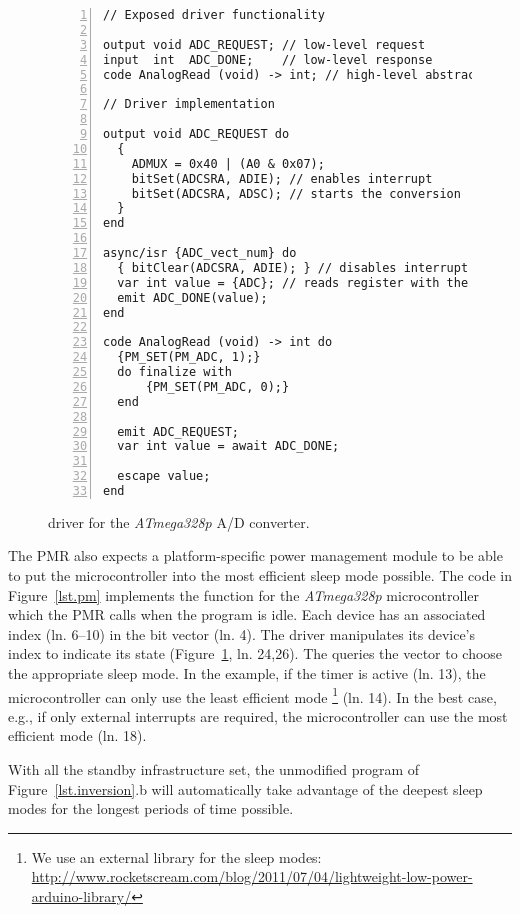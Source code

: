 \begin{figure}[t]
\begin{lstlisting}[numbers=left]
// Exposed driver functionality

output void ADC_REQUEST; // low-level request
input  int  ADC_DONE;    // low-level response
code AnalogRead (void) -> int; // high-level abstraction

// Driver implementation

output void ADC_REQUEST do
  {
    ADMUX = 0x40 | (A0 & 0x07);
    bitSet(ADCSRA, ADIE); // enables interrupt
    bitSet(ADCSRA, ADSC); // starts the conversion
  }
end

async/isr {ADC_vect_num} do
  { bitClear(ADCSRA, ADIE); } // disables interrupt
  var int value = {ADC}; // reads register with the value
  emit ADC_DONE(value);
end

code AnalogRead (void) -> int do
  {PM_SET(PM_ADC, 1);}
  do finalize with
      {PM_SET(PM_ADC, 0);}
  end

  emit ADC_REQUEST;
  var int value = await ADC_DONE;

  escape value;
end
\end{lstlisting}
\caption{ \CEU driver for the \emph{ATmega328p} A/D converter.
\label{lst.adc}
}
\end{figure}

The PMR also expects a platform-specific power management module to be able to
put the microcontroller into the most efficient sleep mode possible.
%
The code in Figure~\ref{lst.pm} implements the  function for
the \emph{ATmega328p} microcontroller which the PMR calls when the program is
idle.
%
Each device has an associated index (ln. 6--10) in the  bit vector
(ln. 4).
%
The driver manipulates its device's index to indicate its state
(Figure~\ref{lst.adc}, ln. 24,26).
%
The  queries the vector to choose the appropriate sleep mode.
In the example, if the timer is active (ln. 13), the microcontroller can only
use the least efficient mode%
\footnote{
    We use an external library for the sleep modes:
    \url{http://www.rocketscream.com/blog/2011/07/04/lightweight-low-power-arduino-library/}
}
(ln. 14).
%
In the best case, e.g., if only external interrupts are required, the
microcontroller can use the most efficient mode (ln. 18).

With all the standby infrastructure set, the unmodified program of
Figure~\ref{lst.inversion}.b will automatically take advantage of the deepest
sleep modes for the longest periods of time possible.

